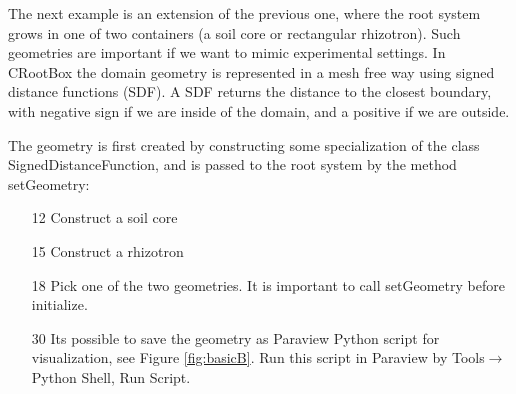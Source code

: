 \documentclass[a4paper]{article}
\begin{document}
The next example is an extension of the previous one, where the root system grows in one of two containers (a soil core or rectangular rhizotron).
Such geometries are important if we want to mimic experimental settings. In CRootBox the domain geometry is represented in a mesh free way using signed distance functions (SDF).
A SDF returns the distance to the closest boundary, with negative sign if we are inside of the domain, and a positive if we are outside.



The geometry is first created by constructing some specialization of the class SignedDistanceFunction, and is passed to the root system by the method setGeometry: 
\begin{itemize}
 \item[12] Construct a soil core 
 \item[15] Construct a rhizotron
 \item[18] Pick one of the two geometries. It is important to call setGeometry before initialize.
 \item[30] Its possible to save the geometry as Paraview Python script for visualization, see Figure \ref{fig:basicB}. Run this script in Paraview by Tools$\rightarrow$Python Shell, Run Script.
\end{itemize}
\end{document}
